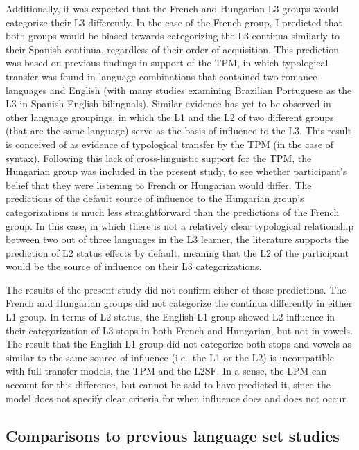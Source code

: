 \documentclass[
  english,
  man]{apa6}
\begin{document}
Additionally, it was expected that the French and Hungarian L3 groups would categorize their L3 differently. In the case of the French group, I predicted that both groups would be biased towards categorizing the L3 continua similarly to their Spanish continua, regardless of their order of acquisition.
This prediction was based on previous findings in support of the TPM, in which typological transfer was found in language combinations that contained two romance languages and English (with many studies examining Brazilian Portuguese as the L3 in Spanish-English bilinguals).
Similar evidence has yet to be observed in other language groupings, in which the L1 and the L2 of two different groups (that are the same language) serve as the basis of influence to the L3. This result is conceived of as evidence of typological transfer by the TPM (in the case of syntax).
Following this lack of cross-linguistic support for the TPM, the Hungarian group was included in the present study, to see whether participant's belief that they were listening to French or Hungarian would differ.
The predictions of the default source of influence to the Hungarian group's categorizations is much less straightforward than the predictions of the French group.
In this case, in which there is not a relatively clear typological relationship between two out of three languages in the L3 learner, the literature supports the prediction of L2 status effects by default, meaning that the L2 of the participant would be the source of influence on their L3 categorizations.

The results of the present study did not confirm either of these predictions. The French and Hungarian groups did not categorize the continua differently in either L1 group.
In terms of L2 status, the English L1 group showed L2 influence in their categorization of L3 stops in both French and Hungarian, but not in vowels. The result that the English L1 group did not categorize both stops and vowels as similar to the same source of influence (i.e.~the L1 or the L2) is incompatible with full transfer models, the TPM and the L2SF.
In a sense, the LPM can account for this difference, but cannot be said to have predicted it, since the model does not specify clear criteria for when influence does and does not occur.

\hypertarget{comparisons-to-previous-language-set-studies}{%
\subsection{Comparisons to previous language set studies}\label{comparisons-to-previous-language-set-studies}}
\end{document}
